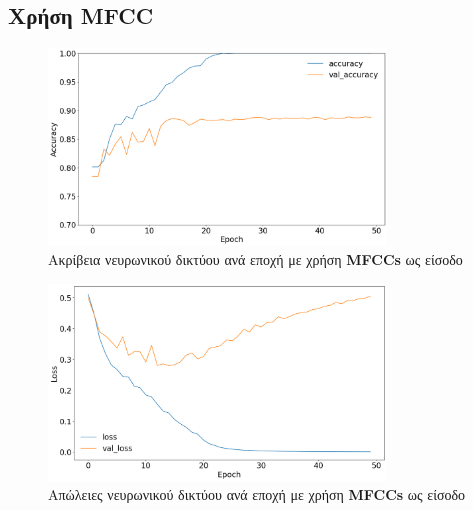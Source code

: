 \documentclass[../main.tex]{subfiles}
\begin{document}
\subsection{Χρήση MFCC}
\begin{figure}[H]
	\center
	\includegraphics[width=0.8\textwidth]{../images/accuracy_mfcc.png}
	\caption{Ακρίβεια νευρωνικού δικτύου ανά εποχή με χρήση \textbf{MFCCs} ως
		είσοδο}
	\label{accuracy_mfcc}
\end{figure}
\begin{figure}[H]
	\center
	\includegraphics[width=0.8\textwidth]{../images/loss_mfcc.png}
	\caption{Απώλειες νευρωνικού δικτύου ανά εποχή με χρήση \textbf{MFCCs} ως
		είσοδο}
	\label{loss_mfcc}
\end{figure}
\end{document}
